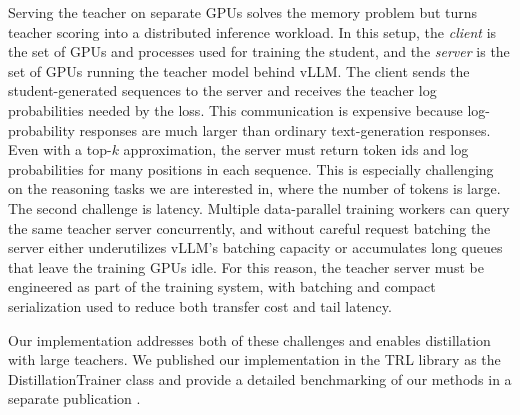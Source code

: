 Serving the teacher on separate GPUs solves the memory problem but turns teacher scoring into a distributed inference workload. In this setup, the \emph{client} is the set of GPUs and processes used for training the student, and the \emph{server} is the set of GPUs running the teacher model behind vLLM. The client sends the student-generated sequences to the server and receives the teacher log probabilities needed by the loss. This communication is expensive because log-probability responses are much larger than ordinary text-generation responses. Even with a top-$k$ approximation, the server must return token ids and log probabilities for many positions in each sequence. This is especially challenging on the reasoning tasks we are interested in, where the number of tokens is large. The second challenge is latency. Multiple data-parallel training workers can query the same teacher server concurrently, and without careful request batching the server either underutilizes vLLM's batching capacity or accumulates long queues that leave the training GPUs idle. For this reason, the teacher server must be engineered as part of the training system, with batching and compact serialization used to reduce both transfer cost and tail latency.

Our implementation addresses both of these challenges and enables distillation with large teachers. We published our implementation in the TRL library \cite{vonwerra2020trl} as the DistillationTrainer class and provide a detailed benchmarking of our methods in a separate publication \cite{patino2026_distilling_100b_models_40x_faster_with_trl}.